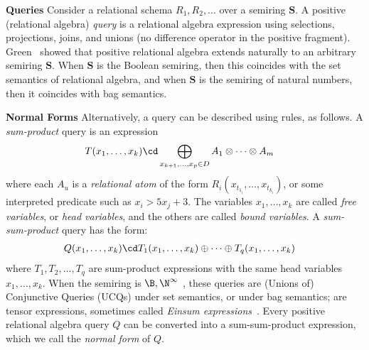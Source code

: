 {\bf Queries} Consider a relational schema $R_1, R_2, \ldots$ over a
semiring $\bm S$.  A positive (relational algebra) {\em
  query} is a relational algebra expression using selections,
projections, joins, and unions (no difference operator in the positive
fragment).    Green~\cite{DBLP:conf/pods/GreenKT07} showed that
positive relational algebra extends naturally to an arbitrary
semi\-ring $\bm S$.  When $\bm S$ is the Boolean semiring, then this
coincides with the set semantics of relational algebra, and when
$\bm S$ is the semiring of natural numbers, then it coincides with bag
semantics.

{\bf Normal Forms} Alternatively, a query can be described using
rules, as follows.  A {\em sum-product} query is an expression
%
\begin{align}
  T(x_1, \ldots, x_k) &\cd \bigoplus_{x_{k+1}, \ldots,x_p \in D} A_1 \otimes  \cdots \otimes A_m
                        \label{eq:t:mono}
\end{align}
%
where each $A_u$ is a {\em relational atom} of the form
$R_i(x_{t_{1_{i}}}, \ldots, x_{t_{k_i}})$, or some interpreted predicate such as
$x_i > 5x_j+3$.  The variables $x_1, \ldots, x_k$ are called {\em
  free variables}, or {\em head variables}, and the others are called
{\em bound variables}.
A {\em sum-sum-product} query has the form:
%
\begin{align}
  Q(x_1, \ldots, x_k) &\cd T_1(x_1, \ldots, x_k) \oplus \cdots \oplus T_q(x_1, \ldots, x_k)
\label{eq:sum:sum:product}
\end{align}
%
where $T_1, T_2, \ldots, T_q$ are sum-product expressions with the
same head variables $x_1, \ldots, x_k$.  When the semiring is
$\B, \N^\infty$ , these queries are (Unions of)
Conjunctive Queries (UCQs) under set semantics, or under bag
semantics;  are tensor expressions, sometimes called {\em Einsum
  expressions}~\cite{einsum:rocktaschel}.
%
Every positive relational algebra query $Q$ can be converted into a
sum-sum-product expression, which we call the {\em normal form} of
$Q$.

